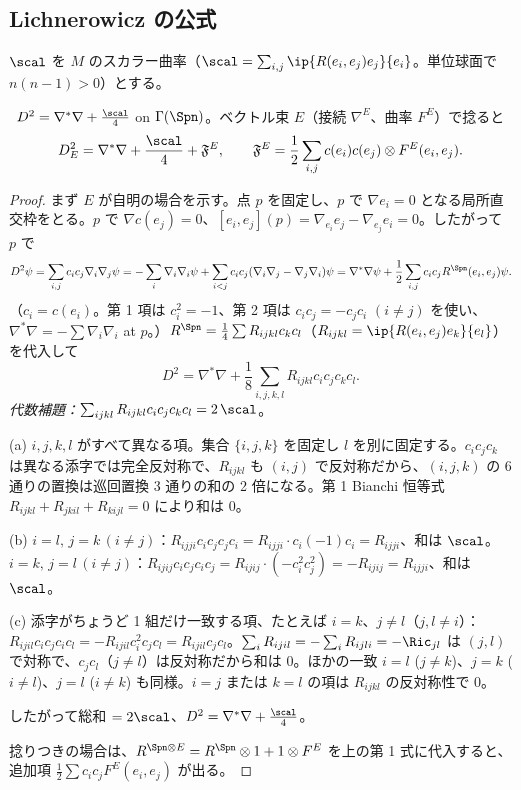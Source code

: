 \subsection{Lichnerowicz の公式}
$\scal$ を $M$ のスカラー曲率（$\scal=\sum_{i,j}\ip{R(e_i,e_j)e_j}{e_i}$。単位球面で $n(n-1)>0$）とする。
\begin{thm}\label{thm:Lich}\tP\
$D^2=\nabla^*\nabla+\frac{\scal}4$ on $\Gamma(\Spn)$。ベクトル束 $E$（接続 $\nabla^E$、曲率 $F^E$）で捻ると
\[
D_E^2=\nabla^*\nabla+\frac{\scal}4+\frak F^E,\qquad\frak F^E=\frac12\sum_{i,j}c(e_i)c(e_j)\otimes F^E(e_i,e_j).
\]
\end{thm}
\begin{proof}
まず $E$ が自明の場合を示す。点 $p$ を固定し、$p$ で $\nabla e_i=0$ となる局所直交枠をとる。$p$ で $\nabla c(e_j)=0$、$[e_i,e_j](p)=\nabla_{e_i}e_j-\nabla_{e_j}e_i=0$。したがって $p$ で
\[
D^2\psi=\sum_{i,j}c_ic_j\nabla_i\nabla_j\psi=-\sum_i\nabla_i\nabla_i\psi+\sum_{i<j}c_ic_j(\nabla_i\nabla_j-\nabla_j\nabla_i)\psi=\nabla^*\nabla\psi+\frac12\sum_{i,j}c_ic_jR^{\Spn}(e_i,e_j)\psi.
\]
（$c_i=c(e_i)$。第 1 項は $c_i^2=-1$、第 2 項は $c_ic_j=-c_jc_i$ $(i\ne j)$ を使い、$\nabla^*\nabla=-\sum\nabla_i\nabla_i$ at $p$。）$R^{\Spn}=\frac14\sum R_{ijkl}c_kc_l$（$R_{ijkl}=\ip{R(e_i,e_j)e_k}{e_l}$）を代入して
\[
D^2=\nabla^*\nabla+\frac18\sum_{i,j,k,l}R_{ijkl}c_ic_jc_kc_l.
\]
\emph{代数補題：}$\sum_{ijkl}R_{ijkl}c_ic_jc_kc_l=2\,\scal$。

(a) $i,j,k,l$ がすべて異なる項。集合 $\{i,j,k\}$ を固定し $l$ を別に固定する。$c_ic_jc_k$ は異なる添字では完全反対称で、$R_{ijkl}$ も $(i,j)$ で反対称だから、$(i,j,k)$ の 6 通りの置換は巡回置換 3 通りの和の 2 倍になる。第 1 Bianchi 恒等式 $R_{ijkl}+R_{jkil}+R_{kijl}=0$ により和は $0$。

(b) $i=l,\,j=k\,(i\ne j)$：$R_{ijji}c_ic_jc_jc_i=R_{ijji}\cdot c_i(-1)c_i=R_{ijji}$、和は $\scal$。$i=k,\,j=l\,(i\ne j)$：$R_{ijij}c_ic_jc_ic_j=R_{ijij}\cdot(-c_i^2c_j^2)=-R_{ijij}=R_{ijji}$、和は $\scal$。

(c) 添字がちょうど 1 組だけ一致する項、たとえば $i=k$、$j\ne l$（$j,l\ne i$）：$R_{ijil}c_ic_jc_ic_l=-R_{ijil}c_i^2c_jc_l=R_{ijil}c_jc_l$。$\sum_iR_{ijil}=-\sum_iR_{ijli}=-\Ric_{jl}$ は $(j,l)$ で対称で、$c_jc_l$（$j\ne l$）は反対称だから和は $0$。ほかの一致 $i=l$ ($j\ne k$)、$j=k$ ($i\ne l$)、$j=l$ ($i\ne k$) も同様。$i=j$ または $k=l$ の項は $R_{ijkl}$ の反対称性で $0$。

したがって総和 $=2\scal$、$D^2=\nabla^*\nabla+\frac{\scal}4$。

捻りつきの場合は、$R^{\Spn\otimes E}=R^{\Spn}\otimes1+1\otimes F^E$ を上の第 1 式に代入すると、追加項 $\frac12\sum c_ic_jF^E(e_i,e_j)$ が出る。
\end{proof}
